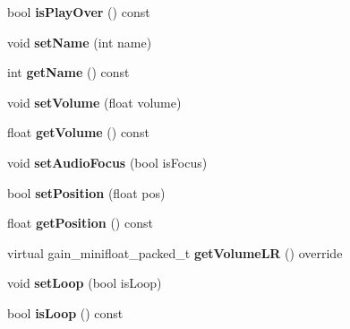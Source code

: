 \begin{DoxyCompactItemize}
bool {\bfseries is\+Play\+Over} () const
\item 
\mbox{\label{classcocos2d_1_1experimental_1_1Track_a0bf441861faa24c315df7308810183ca}} 
void {\bfseries set\+Name} (int name)
\item 
\mbox{\label{classcocos2d_1_1experimental_1_1Track_a51101bc04852f0d110bfdbea940029ec}} 
int {\bfseries get\+Name} () const
\item 
\mbox{\label{classcocos2d_1_1experimental_1_1Track_a125bb641319341f044f8d3f3fe698c19}} 
void {\bfseries set\+Volume} (float volume)
\item 
\mbox{\label{classcocos2d_1_1experimental_1_1Track_aca7e03ebc77f57aaf98ac705595d38c8}} 
float {\bfseries get\+Volume} () const
\item 
\mbox{\label{classcocos2d_1_1experimental_1_1Track_a2c90ba0c4a2ece307a602e110ff024ef}} 
void {\bfseries set\+Audio\+Focus} (bool is\+Focus)
\item 
\mbox{\label{classcocos2d_1_1experimental_1_1Track_a84cde0de42a99cc0dbb3c93bbcad4aa4}} 
bool {\bfseries set\+Position} (float pos)
\item 
\mbox{\label{classcocos2d_1_1experimental_1_1Track_af64db5ace2b78ffd35c2dd0dd81a9bd8}} 
float {\bfseries get\+Position} () const
\item 
\mbox{\label{classcocos2d_1_1experimental_1_1Track_a5c8b2e09fbd5ee798e349040bfad461e}} 
virtual gain\+\_\+minifloat\+\_\+packed\+\_\+t {\bfseries get\+Volume\+LR} () override
\item 
\mbox{\label{classcocos2d_1_1experimental_1_1Track_aa98a9abf6870fe0a16cdac2c86981f30}} 
void {\bfseries set\+Loop} (bool is\+Loop)
\item 
\mbox{\label{classcocos2d_1_1experimental_1_1Track_ab0fc62f055a490719e360205a9dfb8e0}} 
bool {\bfseries is\+Loop} () const
\end{DoxyCompactItemize}
